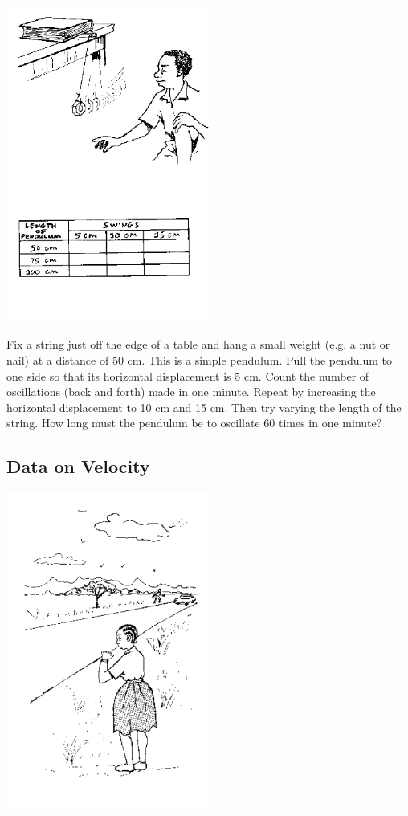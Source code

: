 \begin{multicols}{2}
\begin{center}
\includegraphics[width=0.5\textwidth]{./img/source/meas-time.png}
\end{center}

Fix a string just off the edge of a table and hang a small weight (e.g. a nut or nail) at a distance of 50 cm. This is a simple pendulum. Pull the pendulum to one side so that its horizontal displacement is 5 cm. Count the number of oscillations (back and forth) made in one minute. Repeat by increasing the horizontal displacement to 10 cm and 15 cm. Then try varying the length of the string. How long must the pendulum be to oscillate 60 times in one minute?

\vfill
\columnbreak

\subsection{Data on Velocity}

\begin{center}
\includegraphics[width=0.5\textwidth]{./img/source/meas-velocity.png}
\end{center}


\end{multicols}
